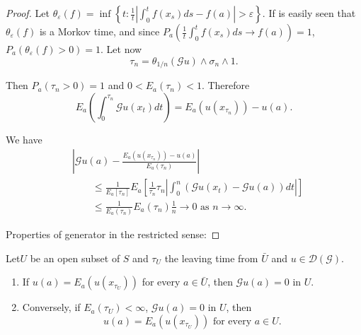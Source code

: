 \begin{proof}
Let $\theta_\varepsilon (f) = \inf \left\{ t : \frac{1}{t} \left|
  \int^t_0 f (x_s) ds -f(a)\right| > \varepsilon\right\}$. If is
  easily seen that $\theta_\varepsilon (f)$ is a Morkov time, and
  since $P_a (\frac{1}{t} \int^t_0 f (x_s) ds \to f (a)) = 1$, $P_a
  (\theta_\varepsilon (f) > 0) = 1$. Let now 
$$
\tau_n = \theta_{1/n} (\mathscr{G} u) \wedge \sigma_n \wedge 1.
$$

Then $P_a (\tau_n > 0) = 1$ and $0 < E_a (\tau_n) < 1$. Therefore
$$
E_a \left(\int^{\tau_n}_0 \mathscr{G} u (x_t)dt\right) = E_a
(u(x_{\tau_{n}}))-u(a). 
$$

We have 
\begin{align*}
& \left| \mathscr{G} u (a) - \frac{E_a (u(x_{\tau_n})) - u(a)}{E_a
    (\tau_n)}\right|\\
&\qquad \leq \frac{1}{E_a[\tau_n]} E_a
  \left[\frac{1}{\tau_{n}}\tau_{n}\left| \int^{n}_0 (\mathscr{G} u(x_t)
  - \mathscr{G} u (a)) dt\right|\right]\\
&\qquad  \leq \frac{1}{E_a (\tau_n)} E_a (\tau_n) \frac{1}{n}
  \to 0 \text{\ as\ } n \to \infty. 
\end{align*}

Properties of generator in the restricted sense:
\end{proof}

\begin{thm}\label{chap2-sec9-thm12}%
  Let\pageoriginale $U$ be an open subset of $S$ and $\tau_U$ the
  leaving time 
  from $\bar{U}$ and $u \in \mathscr{D} (\mathscr{G})$.  
\begin{enumerate}
\renewcommand{\labelenumi}{(\theenumi)}
\item If $u(a) = E_a (u (x_{\tau_U}))$ for every $a \in
  \bar{U}$, then $\mathscr{G} u(a) = 0$ in $U$.
 
\item Conversely, if $E_a (\tau_U) < \infty$, $\mathscr{G} u (a) = 0$
  in $U$, then 
$$
u (a) = E_a (u (x_{\tau_U})) \text{\ for every\ } a \in U.
$$
\end{enumerate}
\end{thm}

